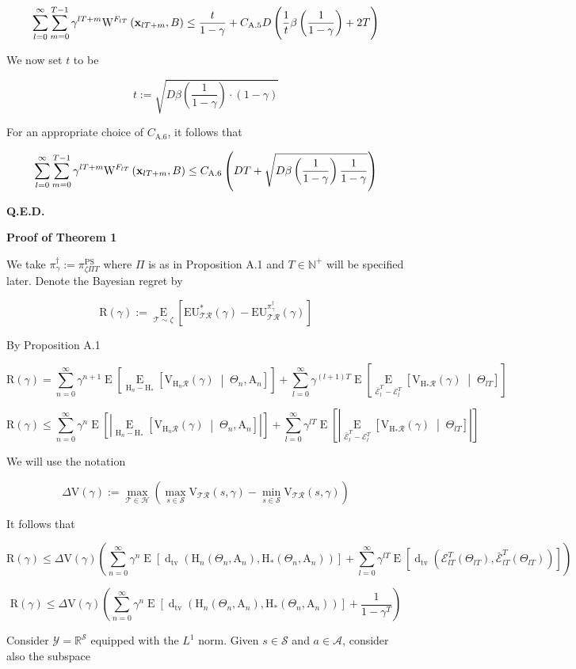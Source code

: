 \documentclass[a4paper]{article}
\newcommand{\Co}[1]{}
\newcommand{\AP}[1]{\left(#1\right)}
\newcommand{\AB}[1]{\left[#1\right]}
\newcommand{\ABM}[2]{\left[#1\;\middle\vert\;#2\right]}
\newcommand{\Ea}[2]{\underset{#1}{\operatorname{E}}\AB{#2}}
\newcommand{\CE}[3]{\underset{#1}{\operatorname{E}}\ABM{#2}{#3}}
\newcommand{\Dtva}[1]{\operatorname{d}_{\text{tv}}\AP{#1}}
\newcommand{\Nats}{\mathbb{N}}
\newcommand{\Reals}{\mathbb{R}}
\newcommand{\Abs}[1]{\left\vert #1 \right\vert}
\newcommand{\Y}{\mathcal{Y}}
\newcommand{\St}{\mathcal{S}}
\newcommand{\A}{\mathcal{A}}
\newcommand{\R}{\mathcal{R}}
\newcommand{\T}{\mathcal{T}}
\newcommand{\Hy}{\mathcal{H}}
\newcommand{\V}{\mathrm{V}}
\newcommand{\EU}{\mathrm{EU}}
\newcommand{\Reg}{\mathrm{R}}
\newcommand{\PSR}{\text{PS}}
\newcommand{\W}{\mathrm{W}}
\newcommand{\AT}{\mathrm{A}}
\newcommand{\THy}{\mathrm{H}_*}
\newcommand{\SHy}{\mathrm{H}}
\newcommand{\Ev}{\mathcal{E}}
\newcommand{\De}{\Delta}
\begin{document}
$$\sum_{l=0}^\infty\sum_{m=0}^{T-1}{\gamma^{lT+m}\W^{F_{lT}}\AP{\bold{x}_{lT+m},B}}\leq\frac{t}{1-\gamma}+C_{\text{A.5}}D \AP{\frac{1}{t}\beta\AP{\frac{1}{1-\gamma}}+2T}$$

We now set $t$ to be

$$t:=\sqrt{D\beta\AP{\frac{1}{1-\gamma}}\cdot(1-\gamma)}$$

For an appropriate choice of $C_{\text{A.6}}$, it follows that

$$\sum_{l=0}^\infty\sum_{m=0}^{T-1}{\gamma^{lT+m}\W^{F_{lT}}\AP{\bold{x}_{lT+m},B}}\leq C_{\text{A.6}}\AP{DT+\sqrt{D\beta\AP{\frac{1}{1-\gamma}}\frac{1}{1-\gamma}}}$$

\textbf{Q.E.D.}\Co{b}

\textbf{Proof of Theorem 1}\Co{b}

We take $\pi^\dagger_\gamma:=\pi^\PSR_{\zeta\Pi T}$ where $\Pi$ is as in Proposition A.1 and $T\in\Nats^+$ will be specified later. Denote the Bayesian regret by

$$\Reg(\gamma):=\Ea{\T\sim\zeta}{\EU^*_{\T\R}(\gamma)-\EU^{\pi_{\gamma}^{\dagger}}_{\T\R}(\gamma)}$$

By Proposition A.1

$$\Reg(\gamma)=\sum_{n=0}^\infty\gamma^{n+1}\Ea{}{\CE{\SHy_n-\THy}{\V_{\SHy_n\R}(\gamma)}{\Theta_n,\AT_n}}+\sum_{l=0}^\infty{\gamma^{(l+1)T}}\Ea{}{\CE{\bar{\Ev}_{l}^T-\Ev_{l}^T}{\V_{\SHy_*\R}(\gamma)}{\Theta_{lT}}}$$

$$\Reg(\gamma)\leq\sum_{n=0}^\infty\gamma^{n}\Ea{}{\Abs{\CE{\SHy_n-\THy}{\V_{\SHy_n\R}(\gamma)}{\Theta_n,\AT_n}}}+\sum_{l=0}^\infty{\gamma^{lT}}\Ea{}{\Abs{\CE{\bar{\Ev}_{l}^T-\Ev_{l}^T}{\V_{\SHy_*\R}(\gamma)}{\Theta_{lT}}}}$$

We will use the notation

$$\De\V(\gamma):=\max_{\T\in\Hy}{\AP{\max_{s\in\St}{\V_{\T\R}(s,\gamma)}-\min_{s\in\St}{\V_{\T\R}(s,\gamma)}}}$$

It follows that

$$\Reg(\gamma)\leq\Delta\V(\gamma)\AP{\sum_{n=0}^\infty\gamma^{n}\Ea{}{\Dtva{\SHy_n\AP{\Theta_n,\AT_n},\THy\AP{\Theta_n,\AT_n}} }+\sum_{l=0}^\infty\gamma^{lT}\Ea{}{\Dtva{\Ev_{lT}^T\AP{\Theta_{lT}},\bar{\Ev}_{lT}^T\AP{\Theta_{lT}}}}}$$

$$\Reg(\gamma)\leq\Delta\V(\gamma)\AP{\sum_{n=0}^\infty\gamma^{n}\Ea{}{\Dtva{\SHy_n\AP{\Theta_n,\AT_n},\THy\AP{\Theta_n,\AT_n}} }+\frac{1}{1-\gamma^T}}$$

Consider $\Y=\Reals^\St$ equipped with the $L^1$ norm. Given $s\in\St$ and $a\in\A$, consider also the subspace
\end{document}
